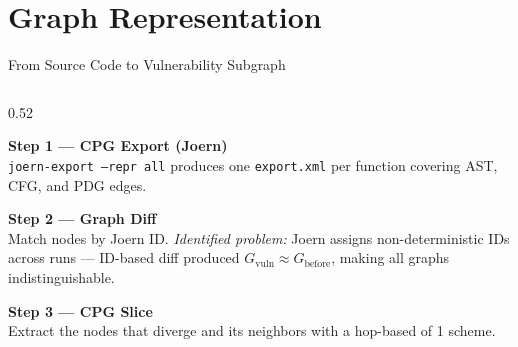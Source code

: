 \documentclass[aspectratio=169,10pt]{beamer}
\begin{document}
\section{Graph Representation}

\begin{frame}{From Source Code to Vulnerability Subgraph}
\begin{columns}[T]
\begin{column}{0.52\textwidth}

  \textbf{Step 1 — CPG Export (Joern)}\\[2pt]
  \texttt{joern-export --repr all} produces one
  \texttt{export.xml} per function covering
  AST, CFG, and PDG edges.

  \vspace{0.8em}
  \textbf{Step 2 — Graph Diff}\\[2pt]
  Match nodes by Joern ID.
  \textit{Identified problem:} Joern assigns non-deterministic IDs across runs — ID-based
  diff produced $G_{\text{vuln}} \approx G_{\text{before}}$,
  making all graphs indistinguishable.



  \vspace{0.6em}
  \textbf{Step 3 — CPG Slice}\\[2pt]
  Extract the nodes that diverge and its neighbors with a hop-based of 1 scheme.



\end{column}
\end{columns}
\end{frame}
\end{document}
